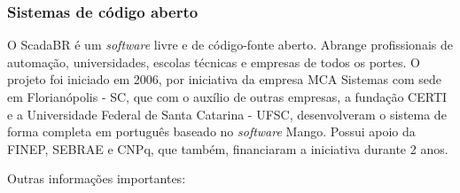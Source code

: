     \subsubsection{Sistemas de código aberto}
    \label{sec:scadaweb}
    
    \label{sec:scadabr}

        O ScadaBR \cite{ScadaBR} é um \textit{software} livre e de código-fonte aberto. Abrange profissionais de automação, universidades, escolas técnicas e empresas de todos os portes. O projeto foi iniciado em 2006, por iniciativa da empresa MCA Sistemas com sede em Florianópolis - SC, que com o auxílio de outras empresas, a fundação CERTI e a Universidade Federal de Santa Catarina - UFSC, desenvolveram o sistema de forma completa em português baseado no \textit{software} Mango. Possui apoio da FINEP, SEBRAE e CNPq, que também, financiaram a iniciativa durante 2 anos.

        \begin{figure}[!h]
	    \end{figure}
	    
	    Outras informações importantes:
	    
